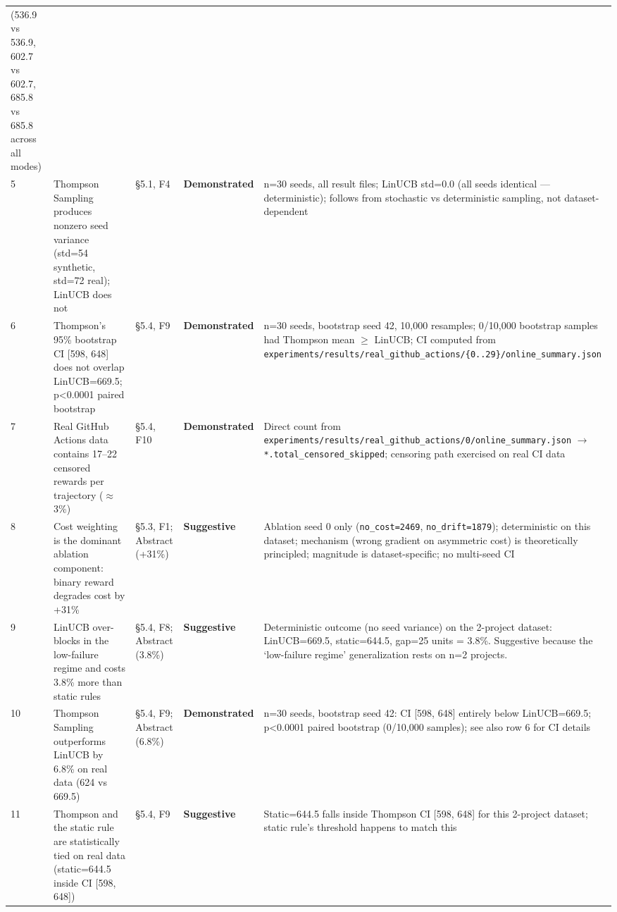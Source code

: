\documentclass[10pt]{article}
\begin{document}
\begin{table}[ht]
\begin{tabular}{lllll}
(536.9 vs 536.9, 602.7 vs 602.7, 685.8 vs 685.8 across all modes) \\
5 & Thompson Sampling produces nonzero seed variance (std=54 synthetic,
std=72 real); LinUCB does not & §5.1, F4 & \textbf{Demonstrated} & n=30
seeds, all result files; LinUCB std=0.0 (all seeds identical ---
deterministic); follows from stochastic vs deterministic sampling, not
dataset-dependent \\
6 & Thompson's 95\% bootstrap CI {[}598, 648{]} does not overlap
LinUCB=669.5; p\textless0.0001 paired bootstrap & §5.4, F9 &
\textbf{Demonstrated} & n=30 seeds, bootstrap seed 42, 10,000 resamples;
0/10,000 bootstrap samples had Thompson mean $\geq$ LinUCB; CI computed from
\texttt{experiments/results/real\_github\_actions/\{0..29\}/online\_summary.json} \\
7 & Real GitHub Actions data contains 17--22 censored rewards per
trajectory ($\approx$3\%) & §5.4, F10 & \textbf{Demonstrated} & Direct count
from
\texttt{experiments/results/real\_github\_actions/0/online\_summary.json}
$\rightarrow$ \texttt{*.total\_censored\_skipped}; censoring path exercised on real
CI data \\
8 & Cost weighting is the dominant ablation component: binary reward
degrades cost by +31\% & §5.3, F1; Abstract (+31\%) &
\textbf{Suggestive} & Ablation seed 0 only (\texttt{no\_cost=2469},
\texttt{no\_drift=1879}); deterministic on this dataset; mechanism
(wrong gradient on asymmetric cost) is theoretically principled;
magnitude is dataset-specific; no multi-seed CI \\
9 & LinUCB over-blocks in the low-failure regime and costs 3.8\% more
than static rules & §5.4, F8; Abstract (3.8\%) & \textbf{Suggestive} &
Deterministic outcome (no seed variance) on the 2-project dataset:
LinUCB=669.5, static=644.5, gap=25 units = 3.8\%. Suggestive because the
`low-failure regime' generalization rests on n=2 projects. \\
10 & Thompson Sampling outperforms LinUCB by 6.8\% on real data (624 vs
669.5) & §5.4, F9; Abstract (6.8\%) & \textbf{Demonstrated} & n=30
seeds, bootstrap seed 42: CI {[}598, 648{]} entirely below LinUCB=669.5;
p\textless0.0001 paired bootstrap (0/10,000 samples); see also row 6 for
CI details \\
11 & Thompson and the static rule are statistically tied on real data
(static=644.5 inside CI {[}598, 648{]}) & §5.4, F9 & \textbf{Suggestive}
& Static=644.5 falls inside Thompson CI {[}598, 648{]} for this
2-project dataset; static rule's threshold happens to match this

\end{tabular}
\end{table}
\end{document}
